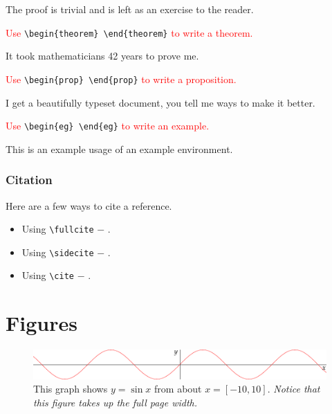 \begin{myproof}
	The proof is trivial and is left as an exercise to the reader.
\end{myproof}

\textcolor{red}{Use} \verb|\begin{theorem} \end{theorem}| \textcolor{red}{to write a theorem.}

\begin{theorem}
	It took mathematicians 42 years to prove me.
\end{theorem}

\textcolor{red}{Use} \verb|\begin{prop} \end{prop}| \textcolor{red}{to write a proposition.}

\begin{prop}
	I get a beautifully typeset document, you tell me ways to make it better.
\end{prop}

\textcolor{red}{Use} \verb|\begin{eg} \end{eg}| \textcolor{red}{to write an example.}

\begin{eg}[An Example.]
	This is an example usage of an example environment.
\end{eg}

\subsubsection{Citation}


Here are a few ways to cite a reference.
\begin{itemize}
	\item Using \verb|\fullcite| $-$ .
	\item Using \verb|\sidecite| $-$ .
	\item Using \verb|\cite| $-$ \cite{milnor}.
\end{itemize}

\section*{Figures}

\begin{figure}[h]
	\includegraphics[width=\linewidth]{sine.pdf}%
	\caption{This graph shows $y = \sin x$ from about $x = [-10, 10]$.
		\emph{Notice that this figure takes up the full page width.}}%
	\label{fig:fullfig}%
\end{figure}

